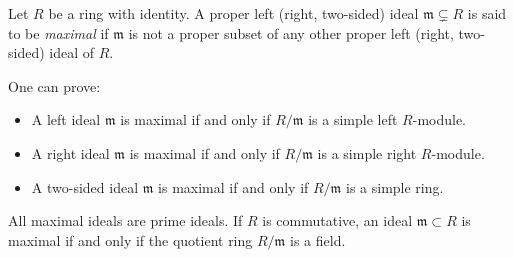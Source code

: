 \documentclass{article}
\begin{document}
Let $R$ be a ring with identity. A proper left (right, two-sided) ideal $\mathfrak{m} \subsetneq R$ is said to be {\em maximal} if $\mathfrak{m}$ is not a proper subset of any other proper left (right, two-sided) ideal of $R$.

One can prove:
\begin{itemize}
\item A left ideal $\mathfrak{m}$ is maximal if and only if $R/\mathfrak{m}$ is a simple left $R$-module.
\item A right ideal $\mathfrak{m}$ is maximal if and only if $R/\mathfrak{m}$ is a simple right $R$-module.

\item A two-sided ideal $\mathfrak{m}$ is maximal if and only if $R/\mathfrak{m}$ is a simple ring.
\end{itemize}

All maximal ideals are prime ideals. If $R$ is commutative, an ideal $\mathfrak{m} \subset R$ is maximal if and only if the quotient ring $R/\mathfrak{m}$ is a field.
\end{document}
